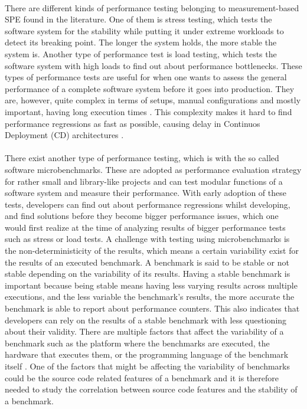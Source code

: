 \documentclass{seal_thesis}
\begin{document}
\\
There are different kinds of performance testing belonging to measurement-based SPE found in the literature. One of them is stress testing, which tests the software system for the stability while putting it under extreme workloads to detect its breaking point. The longer the system holds, the more stable the system is. Another type of performance test is load testing, which tests the software system with high loads to find out about performance bottlenecks. These types of performance tests are useful for when one wants to assess the general performance of a complete software system before it goes into production. They are, however, quite complex in terms of setups, manual configurations and mostly important, having long execution times \cite{Nguyen:2014:ICS:2597073.2597092}. This complexity makes it hard to find performance regressions as fast as possible, causing delay in Continuos Deployment (CD) architectures \cite{Laaber:2018:EOS:3196398.3196407}.\\
\\
There exist another type of performance testing, which is with the so called software microbenchmarks. These are adopted as performance evaluation strategy for rather small and library-like projects\cite{laaber2019software} and can test modular functions of a software system and measure their performance\cite{costa2019}. With early adoption of these tests, developers can find out about performance regressions whilst developing, and find solutions before they become bigger performance issues, which one would first realize at the time of analyzing results of bigger performance tests such as stress or load tests. A challenge with testing using microbenchmarks is the non-deterministicity of the results, which means a certain variability exist for the results of an executed benchmark\cite{Laaber:2018:EOS:3196398.3196407}. A benchmark is said to be stable or not stable depending on the variability of its results. Having a stable benchmark is important because being stable means having less varying results across multiple executions, and the less variable the benchmark's results, the more accurate the benchmark is able to report about performance counters. This also indicates that developers can rely on the results of a stable benchmark with less questioning about their validity. There are multiple factors that affect the variability of a benchmark such as the platform where the benchmarks are executed, the hardware that executes them, or the programming language of the benchmark itself \cite{laaber2018performance}. One of the factors that might be affecting the variability of benchmarks could be the source code related features of a benchmark and it is therefore needed to study the correlation between source code features and the stability of a benchmark.\\
\end{document}
